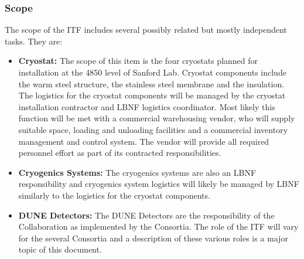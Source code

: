 \subsubsection{Scope}
The scope of the ITF includes several possibly related but mostly
independent tasks. They are:
\begin{itemize}
\item{\bf Cryostat:} The scope of this item is the four cryostats
  planned for installation at the 4850 level of Sanford Lab. Cryostat
  components include the warm steel structure, the stainless steel membrane and
  the insulation. The logistics for the cryostat components will be
  managed by the cryostat installation contractor and LBNF logistics
  coordinator.  Most likely this function will be met with a
  commercial warehousing vendor, who will supply suitable space,
  loading and unloading facilities and a commercial inventory
  management and control system. The vendor will provide all required
  personnel effort as part of its contracted responsibilities.
\item{\bf Cryogenics Systems:} The cryogenics systems are also an LBNF
  responsibility and cryogenics system logistics will likely be
  managed by LBNF similarly to the logistics for the cryostat
  components.
\item{\bf DUNE Detectors:} The DUNE Detectors are the responsibility
  of the Collaboration as implemented by the Consortia. The role of
  the ITF will vary for the several Consortia and a description of
  these various roles is a major topic of this document.
\end{itemize}

